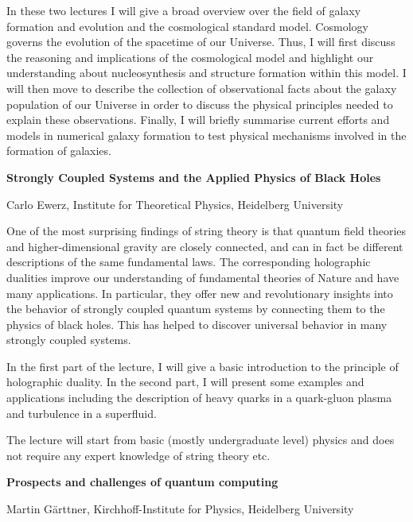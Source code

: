 \noindent In these two lectures I will give a broad overview over the field of galaxy formation and evolution and the cosmological standard model.
Cosmology governs the evolution of the spacetime of our Universe. Thus, I will first discuss the reasoning and implications of the cosmological model and highlight our understanding about nucleosynthesis and structure formation within this model.
I will then move to describe the collection of observational facts about the galaxy population of our Universe in order to discuss the physical principles needed to explain these observations. Finally, I will briefly summarise current efforts and models in numerical galaxy formation to test physical mechanisms involved in the formation of galaxies.
 
\par
\newpage




\begin{center}
{{\large\bfseries Strongly Coupled Systems and the Applied Physics of Black Holes}\par} \medskip

{\large Carlo Ewerz, Institute for Theoretical Physics, Heidelberg University\par}
\end{center}

\noindent One of the most surprising findings of string theory is that quantum field theories and higher-dimensional gravity are closely connected, and can in fact be different descriptions of the same fundamental laws. The corresponding holographic dualities improve our understanding of fundamental theories of Nature and have many applications. In particular, they offer new and revolutionary insights into the behavior of strongly coupled quantum systems by connecting them to the physics of black holes. This has helped to discover universal behavior in many strongly coupled systems.
 
In the first part of the lecture, I will give a basic introduction to the principle of holographic duality. In the second part, I will present some examples and applications including the description of heavy quarks in a quark-gluon plasma and turbulence in a superfluid.
 
The lecture will start from basic (mostly undergraduate level) physics and does not require any expert knowledge of string theory etc.
\par
\newpage

\begin{center}
{{\large\bfseries Prospects and challenges of quantum computing}\par} \medskip

{\large Martin Gärttner, Kirchhoff-Institute for Physics, Heidelberg University\par}
\end{center}

